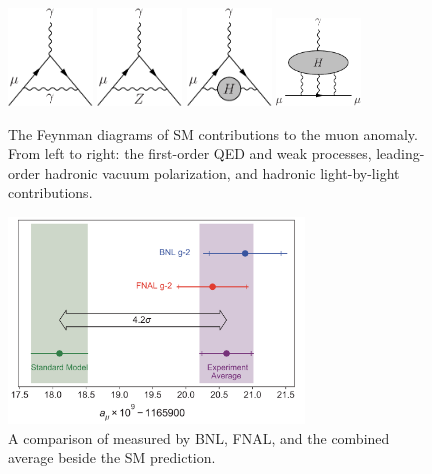 \begin{figure}[H]
    \centering
    \includegraphics[width=0.2\textwidth]{Images/Theory/Muon_gminus2_photon.pdf}\hspace{0.05\textwidth}
    \includegraphics[width=0.2\textwidth]{Images/Theory/Muon_gminus2_Z.pdf}\hspace{0.05\textwidth}
    \includegraphics[width=0.2\textwidth]{Images/Theory/Muon_gminus2_Hadronic.pdf}\hspace{0.05\textwidth}
    \includegraphics[width=0.2\textwidth]{Images/Theory/Muon_gminus2_Hadronic2.pdf}
    \caption{The Feynman diagrams of SM contributions to the muon anomaly. From left to right: the first-order QED and weak processes, leading-order hadronic vacuum polarization, and hadronic light-by-light contributions.}
    \label{fig:amu}
\end{figure}

\begin{figure}[H]
    \centering
    \includegraphics[width=0.7\textwidth]{Images/Theory/MuonAnomaly.png}
    \caption{A comparison of \amuon measured by BNL, FNAL, and the combined average beside the SM prediction.}
    \label{fig:amuExp}
\end{figure}

